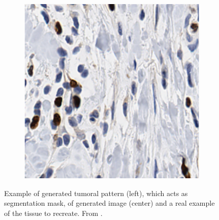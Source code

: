 \begin{figure}[t]
\begin{subfigure}[t]{0.3\textwidth}
             \caption{}
             \label{fig:cgan_model}
        \end{subfigure}
        \quad
        \begin{subfigure}[t]{0.3\textwidth}
             \centering
             \includegraphics[width = \textwidth]{images/cgan_real}
             \caption{}
             \label{fig:cgan_real}
        \end{subfigure}
        \caption{Example of generated tumoral pattern (left), which acts as segmentation mask, of generated image (center) and a real example of the tissue to recreate. From \cite{Senaras2018}.}
        \label{fig:cgan_tripl}
    \end{figure}

